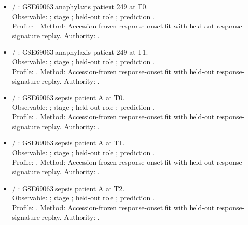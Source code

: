 \begin{itemize}
\item {} / : GSE69063 anaphylaxis patient 249 at T0.\\ Observable: ; stage ; held-out role ; prediction .\\ Profile: . Method: Accession-frozen response-onset fit with held-out response-signature replay. Authority: .
\item {} / : GSE69063 anaphylaxis patient 249 at T1.\\ Observable: ; stage ; held-out role ; prediction .\\ Profile: . Method: Accession-frozen response-onset fit with held-out response-signature replay. Authority: .
\item {} / : GSE69063 sepsis patient A at T0.\\ Observable: ; stage ; held-out role ; prediction .\\ Profile: . Method: Accession-frozen response-onset fit with held-out response-signature replay. Authority: .
\item {} / : GSE69063 sepsis patient A at T1.\\ Observable: ; stage ; held-out role ; prediction .\\ Profile: . Method: Accession-frozen response-onset fit with held-out response-signature replay. Authority: .
\item {} / : GSE69063 sepsis patient A at T2.\\ Observable: ; stage ; held-out role ; prediction .\\ Profile: . Method: Accession-frozen response-onset fit with held-out response-signature replay. Authority: .

\end{itemize}
